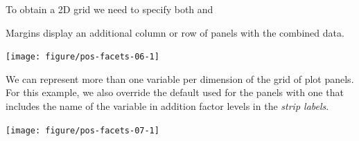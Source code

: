 \documentclass[krantz2]{krantz}\usepackage{knitr}%
\begin{document}
To obtain a 2D grid we need to specify both  and 

\begin{knitrout}\footnotesize
{}\color{fgcolor}\begin{kframe}
\begin{alltt}
 \hlopt{+} \hlstd{(} \hlstd{=}   \hlstd{=} 
\end{alltt}
\end{kframe}
\end{knitrout}



Margins display an additional column or row of panels with the combined data.

\begin{knitrout}\footnotesize
{}\color{fgcolor}\begin{kframe}
\begin{alltt}
 \hlopt{+} \hlstd{(} \hlstd{=}   \hlstd{=} \hlstd{)}
\end{alltt}
\end{kframe}

{\centering \texttt{[image: figure/pos-facets-06-1]} 

}



\end{knitrout}

We can represent more than one variable per dimension of the grid of plot panels. For this example, we also override the default  used for the panels with one that includes the name of the variable in addition factor levels in the \emph{strip labels}.

\begin{knitrout}\footnotesize
{}\color{fgcolor}\begin{kframe}
\begin{alltt}
 \hlopt{+} \hlstd{(} \hlstd{=}   
\end{alltt}
\end{kframe}

{\centering \texttt{[image: figure/pos-facets-07-1]} 

}



\end{knitrout}
\end{document}
